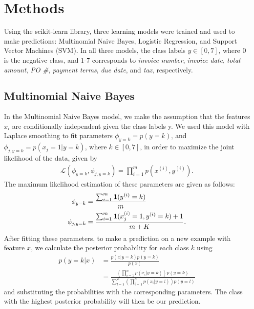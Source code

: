 \section{Methods}
Using the scikit-learn library\cite{scikit-learn}, three learning models were trained and used to make predictions: Multinomial Naive Bayes, Logistic Regression, and Support Vector Machines (SVM). In all three models, the class labels $y\in[0, 7]$, where 0 is the negative class, and 1-7 corresponds to \textit{invoice number}, \textit{invoice date}, \textit{total amount}, \textit{PO \#}, \textit{payment terms}, \textit{due date}, and \textit{tax}, respectively.
\subsection{Multinomial Naive Bayes}
In the Multinomial Naive Bayes model, we make the assumption that the features $x_i$ are conditionally independent given the class labels y. We used this model with Laplace smoothing to fit parameters $\phi_{y=k}=p(y=k)$, and $\phi_{j, y=k} = p(x_j=1\vert y=k)$, where $k\in[0,7]$, in order to maximize the joint likelihood of the data, given by
\begin{align*}
\mathcal{L}(\phi_{y=k}, \phi_{j, y=k}) = \prod_{i=1}^mp(x^{(i)}, y^{(i)}).
\end{align*}
The maximum likelihood estimation of these parameters are given as follows:
\begin{align*}
\phi_{y=k} &= \frac{\sum_{i=1}^m{\bf 1}(y^{(i)}=k)}{m}\\
\phi_{j, y=k} &= \frac{\sum_{i=1}^m{\bf 1}(x_j^{(i)}=1, y^{(i)}=k)+1}{m+K}.
\end{align*}
After fitting these parameters, to make a prediction on a new example with feature $x$, we calculate the posterior probability for each class $k$ using
\begin{align*}
p(y=k\vert x) &= \frac{p(x\vert y=k)p(y=k)}{p(x)} \\
&= \frac{(\prod_{i=1}^np(x_i\vert y=k))p(y=k)}{\sum_{l=1}^K(\prod_{i=1}^np(x_i\vert y=l))p(y=l)}
\end{align*}
and substituting the probabilities with the corresponding parameters. The class with the highest posterior probability will then be our prediction.

